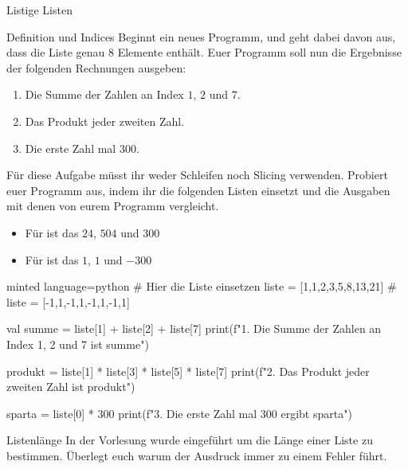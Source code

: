 \begin{task}[points=auto]{Listige Listen}
    \begin{subtask*}[points=0]{Definition und Indices }
        Beginnt ein neues Programm, und geht dabei davon aus, dass die Liste
         genau $8$ Elemente enthält. Euer Programm soll
        nun die Ergebnisse der folgenden Rechnungen ausgeben:

        \begin{enumerate}
            \item Die Summe der Zahlen an Index $1$, $2$ und $7$.
            \item Das Produkt jeder zweiten Zahl.
            \item Die erste Zahl mal 300.
        \end{enumerate}

        Für diese Aufgabe müsst ihr weder Schleifen noch Slicing verwenden. Probiert
        euer Programm aus, indem ihr die folgenden Listen einsetzt und die Ausgaben
        mit denen von eurem Programm vergleicht.

        \begin{itemize}
            \item Für  ist das $24$, $504$ und $300$
            \item Für  ist das $1$, $1$ und $-300$
        \end{itemize}

        \begin{solution}
            \begin{codeBlock}[]{minted language=python}
                # Hier die Liste einsetzen
                liste = [1,1,2,3,5,8,13,21]
                # liste = [-1,1,-1,1,-1,1,-1,1]

                val summe = liste[1] + liste[2] + liste[7]
                print(f"1. Die Summe der Zahlen an Index 1, 2 und 7 ist {summe}")

                produkt = liste[1] * liste[3] * liste[5] * liste[7]
                print(f"2. Das Produkt jeder zweiten Zahl ist {produkt}")

                sparta = liste[0] * 300
                print(f"3. Die erste Zahl mal 300 ergibt {sparta}")
            \end{codeBlock}
        \end{solution}
    \end{subtask*}
    \begin{subtask*}[points=0]{Listenlänge }
        In der Vorlesung wurde  eingeführt um die Länge einer
        Liste zu bestimmen. Überlegt euch warum der Ausdruck 
        immer zu einem Fehler führt.


\end{subtask*}
\end{task}
